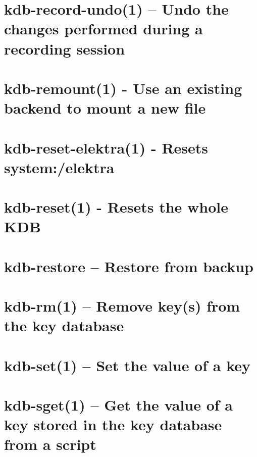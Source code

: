 \let\mypdfximage\pdfximage\def\pdfximage{\immediate\mypdfximage}\documentclass[twoside]{book}
\newcommand{\+}{\discretionary{\mbox{\scriptsize$\hookleftarrow$}}{}{}}
\begin{document}
\chapter{kdb-\/record-\/undo(1) -- Undo the changes performed during a recording session}
\label{doc_help_kdb-record-undo_md}

\chapter{kdb-\/remount(1) -\/ Use an existing backend to mount a new file}
\label{doc_help_kdb-remount_md}

\chapter{kdb-\/reset-\/elektra(1) -\/ Resets system\+:/elektra}
\label{doc_help_kdb-reset-elektra_md}

\chapter{kdb-\/reset(1) -\/ Resets the whole KDB}
\label{doc_help_kdb-reset_md}

\chapter{kdb-\/restore -- Restore from backup}
\label{doc_help_kdb-restore_md}

\chapter{kdb-\/rm(1) -- Remove key(s) from the key database}
\label{doc_help_kdb-rm_md}

\chapter{kdb-\/set(1) -- Set the value of a key}
\label{doc_help_kdb-set_md}

\chapter{kdb-\/sget(1) -- Get the value of a key stored in the key database from a script}
\label{doc_help_kdb-sget_md}

\end{document}
